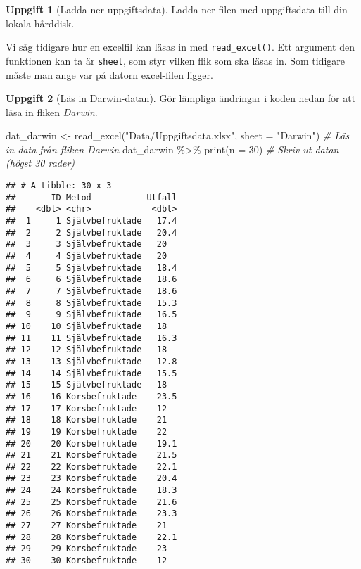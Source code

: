 \documentclass[
]{book}
\newenvironment{Shaded}{\begin{snugshade}}{\end{snugshade}}
\newcommand{\AttributeTok}[1]{\textcolor[rgb]{0.77,0.63,0.00}{#1}}
\newcommand{\CommentTok}[1]{\textcolor[rgb]{0.56,0.35,0.01}{\textit{#1}}}
\newcommand{\DecValTok}[1]{\textcolor[rgb]{0.00,0.00,0.81}{#1}}
\newcommand{\FunctionTok}[1]{\textcolor[rgb]{0.00,0.00,0.00}{#1}}
\newcommand{\NormalTok}[1]{#1}
\newcommand{\OtherTok}[1]{\textcolor[rgb]{0.56,0.35,0.01}{#1}}
\newcommand{\SpecialCharTok}[1]{\textcolor[rgb]{0.00,0.00,0.00}{#1}}
\newcommand{\StringTok}[1]{\textcolor[rgb]{0.31,0.60,0.02}{#1}}
\theoremstyle{definition}
\theoremstyle{definition}
\theoremstyle{definition}
\newtheorem{exercise}{Uppgift}[chapter]
\theoremstyle{definition}
\theoremstyle{remark}
\begin{document}
\begin{exercise}[Ladda ner uppgiftsdata]
Ladda ner filen med uppgiftsdata till din lokala hårddisk.
\end{exercise}

Vi såg tidigare hur en excelfil kan läsas in med \texttt{read\_excel()}. Ett argument den funktionen kan ta är \texttt{sheet}, som styr vilken flik som ska läsas in. Som tidigare måste man ange var på datorn excel-filen ligger.

\begin{exercise}[Läs in Darwin-datan]

Gör lämpliga ändringar i koden nedan för att läsa in fliken \emph{Darwin}.

\begin{Shaded}
\begin{Highlighting}[]
\NormalTok{dat\_darwin }\OtherTok{\textless{}{-}} \FunctionTok{read\_excel}\NormalTok{(}\StringTok{"Data/Uppgiftsdata.xlsx"}\NormalTok{, }\AttributeTok{sheet =} \StringTok{"Darwin"}\NormalTok{)      }\CommentTok{\# Läs in data från fliken Darwin}
\NormalTok{dat\_darwin }\SpecialCharTok{\%\textgreater{}\%} \FunctionTok{print}\NormalTok{(}\AttributeTok{n =} \DecValTok{30}\NormalTok{)                                              }\CommentTok{\# Skriv ut datan (högst 30 rader)}
\end{Highlighting}
\end{Shaded}

\begin{verbatim}
## # A tibble: 30 x 3
##       ID Metod           Utfall
##    <dbl> <chr>            <dbl>
##  1     1 Självbefruktade   17.4
##  2     2 Självbefruktade   20.4
##  3     3 Självbefruktade   20  
##  4     4 Självbefruktade   20  
##  5     5 Självbefruktade   18.4
##  6     6 Självbefruktade   18.6
##  7     7 Självbefruktade   18.6
##  8     8 Självbefruktade   15.3
##  9     9 Självbefruktade   16.5
## 10    10 Självbefruktade   18  
## 11    11 Självbefruktade   16.3
## 12    12 Självbefruktade   18  
## 13    13 Självbefruktade   12.8
## 14    14 Självbefruktade   15.5
## 15    15 Självbefruktade   18  
## 16    16 Korsbefruktade    23.5
## 17    17 Korsbefruktade    12  
## 18    18 Korsbefruktade    21  
## 19    19 Korsbefruktade    22  
## 20    20 Korsbefruktade    19.1
## 21    21 Korsbefruktade    21.5
## 22    22 Korsbefruktade    22.1
## 23    23 Korsbefruktade    20.4
## 24    24 Korsbefruktade    18.3
## 25    25 Korsbefruktade    21.6
## 26    26 Korsbefruktade    23.3
## 27    27 Korsbefruktade    21  
## 28    28 Korsbefruktade    22.1
## 29    29 Korsbefruktade    23  
## 30    30 Korsbefruktade    12
\end{verbatim}

\end{exercise}
\end{document}
